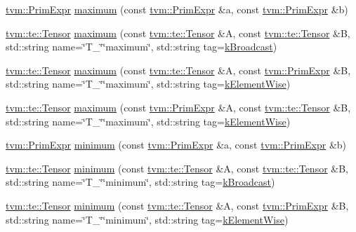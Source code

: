 \begin{DoxyCompactItemize}
\item 
\hyperlink{classtvm_1_1PrimExpr}{tvm\+::\+Prim\+Expr} \hyperlink{namespacetopi_a09126c7373a571b8f24e8206c24e6bf5}{maximum} (const \hyperlink{classtvm_1_1PrimExpr}{tvm\+::\+Prim\+Expr} \&a, const \hyperlink{classtvm_1_1PrimExpr}{tvm\+::\+Prim\+Expr} \&b)
\item 
\hyperlink{classtvm_1_1te_1_1Tensor}{tvm\+::te\+::\+Tensor} \hyperlink{namespacetopi_a5001dfca5d1dc9f53129e4f68f09e007}{maximum} (const \hyperlink{classtvm_1_1te_1_1Tensor}{tvm\+::te\+::\+Tensor} \&A, const \hyperlink{classtvm_1_1te_1_1Tensor}{tvm\+::te\+::\+Tensor} \&B, std\+::string name=\char`\"{}T\+\_\+\char`\"{}\char`\"{}maximum\char`\"{}, std\+::string tag=\hyperlink{namespacetopi_a794b9155e9ba9d1c9c42a1cff1fb645f}{k\+Broadcast})
\item 
\hyperlink{classtvm_1_1te_1_1Tensor}{tvm\+::te\+::\+Tensor} \hyperlink{namespacetopi_adad7c1ee8b41849ee87b48a8555f2fe9}{maximum} (const \hyperlink{classtvm_1_1te_1_1Tensor}{tvm\+::te\+::\+Tensor} \&A, const \hyperlink{classtvm_1_1PrimExpr}{tvm\+::\+Prim\+Expr} \&B, std\+::string name=\char`\"{}T\+\_\+\char`\"{}\char`\"{}maximum\char`\"{}, std\+::string tag=\hyperlink{namespacetopi_ac1b34ed59d38a5f5338bee6b2cad42be}{k\+Element\+Wise})
\item 
\hyperlink{classtvm_1_1te_1_1Tensor}{tvm\+::te\+::\+Tensor} \hyperlink{namespacetopi_a4492e0c372c88ca8445ea287fb70f033}{maximum} (const \hyperlink{classtvm_1_1PrimExpr}{tvm\+::\+Prim\+Expr} \&A, const \hyperlink{classtvm_1_1te_1_1Tensor}{tvm\+::te\+::\+Tensor} \&B, std\+::string name=\char`\"{}T\+\_\+\char`\"{}\char`\"{}maximum\char`\"{}, std\+::string tag=\hyperlink{namespacetopi_ac1b34ed59d38a5f5338bee6b2cad42be}{k\+Element\+Wise})
\item 
\hyperlink{classtvm_1_1PrimExpr}{tvm\+::\+Prim\+Expr} \hyperlink{namespacetopi_afab96b6fc623d4bbb98bd381435d4dea}{minimum} (const \hyperlink{classtvm_1_1PrimExpr}{tvm\+::\+Prim\+Expr} \&a, const \hyperlink{classtvm_1_1PrimExpr}{tvm\+::\+Prim\+Expr} \&b)
\item 
\hyperlink{classtvm_1_1te_1_1Tensor}{tvm\+::te\+::\+Tensor} \hyperlink{namespacetopi_a95b143a6c45b5a4c0b6c7e2f091385a6}{minimum} (const \hyperlink{classtvm_1_1te_1_1Tensor}{tvm\+::te\+::\+Tensor} \&A, const \hyperlink{classtvm_1_1te_1_1Tensor}{tvm\+::te\+::\+Tensor} \&B, std\+::string name=\char`\"{}T\+\_\+\char`\"{}\char`\"{}minimum\char`\"{}, std\+::string tag=\hyperlink{namespacetopi_a794b9155e9ba9d1c9c42a1cff1fb645f}{k\+Broadcast})
\item 
\hyperlink{classtvm_1_1te_1_1Tensor}{tvm\+::te\+::\+Tensor} \hyperlink{namespacetopi_a1108b5cf17036661a85858f3f746e6d8}{minimum} (const \hyperlink{classtvm_1_1te_1_1Tensor}{tvm\+::te\+::\+Tensor} \&A, const \hyperlink{classtvm_1_1PrimExpr}{tvm\+::\+Prim\+Expr} \&B, std\+::string name=\char`\"{}T\+\_\+\char`\"{}\char`\"{}minimum\char`\"{}, std\+::string tag=\hyperlink{namespacetopi_ac1b34ed59d38a5f5338bee6b2cad42be}{k\+Element\+Wise})

\end{DoxyCompactItemize}
